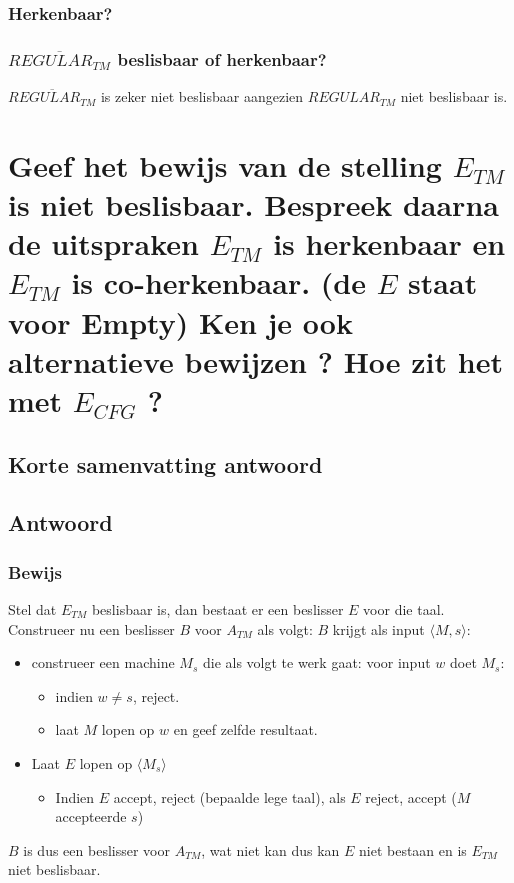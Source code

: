 \documentclass{article}
\begin{document}
        \subsubsection{Herkenbaar?}
            
        \subsubsection{$\overline{REGULAR_{TM}}$ beslisbaar of herkenbaar?}
            $\overline{REGULAR_{TM}}$ is zeker niet beslisbaar aangezien $REGULAR_{TM}$ niet beslisbaar is.




\newpage
\section{Geef het bewijs van de stelling $E_{TM}$ is niet beslisbaar. Bespreek daarna de uitspraken $E_{TM}$ is herkenbaar en $E_{TM}$ is co-herkenbaar. (de $E$ staat voor Empty) Ken je ook alternatieve bewijzen ? Hoe zit het met $E_{CFG}$ ?}
    \subsection{Korte samenvatting antwoord}
        
    \subsection{Antwoord}
        \subsubsection{Bewijs}
            Stel dat $E_{TM}$ beslisbaar is, dan bestaat er een beslisser $E$ voor die taal. Construeer nu een beslisser $B$ voor $A_{TM}$ als volgt: $B$ krijgt als input $\langle M, s \rangle$:
            \begin{itemize}
                \item construeer een machine $M_s$ die als volgt te werk gaat: voor input $w$ doet $M_s$:
                \begin{itemize}
                    \item indien $w \neq s$, reject.
                    \item laat $M$ lopen op $w$ en geef zelfde resultaat.
                \end{itemize}
                \item Laat $E$ lopen op $\langle M_s \rangle$
                \begin{itemize}
                    \item Indien $E$ accept, reject (bepaalde lege taal), als $E$ reject, accept ($M$ accepteerde $s$)
                \end{itemize}
            \end{itemize}
            $B$ is dus een beslisser voor $A_{TM}$, wat niet kan dus kan $E$ niet bestaan en is $E_{TM}$ niet beslisbaar.
\end{document}
